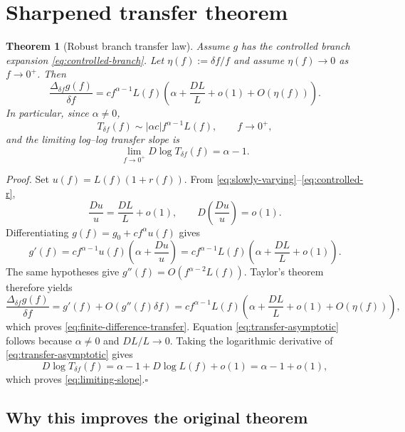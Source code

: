 \documentclass[11pt,a4paper]{article}
\newtheorem{theorem}{Theorem}
\begin{document}
\section{Sharpened transfer theorem}

\begin{theorem}[Robust branch transfer law]\label{thm:robust-transfer}
Assume $g$ has the controlled branch expansion \eqref{eq:controlled-branch}. Let $\eta(f):=\delta f/f$ and assume $\eta(f)\to0$ as $f\to0^+$. Then
\begin{equation}\label{eq:finite-difference-transfer}
    \frac{\Delta_{\delta f}g(f)}{\delta f}
    =c f^{\alpha-1}L(f)\left(\alpha+\frac{DL}{L}+o(1)+O(\eta(f))\right).
\end{equation}
In particular, since $\alpha\ne0$,
\begin{equation}\label{eq:transfer-asymptotic}
    T_{\delta f}(f)
    \sim |\alpha c| f^{\alpha-1}L(f),
    \qquad f\to0^+,
\end{equation}
and the limiting log--log transfer slope is
\begin{equation}\label{eq:limiting-slope}
    \lim_{f\to0^+}D\log T_{\delta f}(f)=\alpha-1.
\end{equation}
\end{theorem}

\noindent\emph{Proof.}
Set $u(f)=L(f)(1+r(f))$. From \eqref{eq:slowly-varying}--\eqref{eq:controlled-r},
\[
    \frac{Du}{u}=\frac{DL}{L}+o(1),
    \qquad
    D\!\left(\frac{Du}{u}\right)=o(1).
\]
Differentiating $g(f)=g_0+c f^{\alpha}u(f)$ gives
\[
    g'(f)=c f^{\alpha-1}u(f)\left(\alpha+\frac{Du}{u}\right)
    =c f^{\alpha-1}L(f)\left(\alpha+\frac{DL}{L}+o(1)\right).
\]
The same hypotheses give $g''(f)=O(f^{\alpha-2}L(f))$. Taylor's theorem therefore yields
\[
    \frac{\Delta_{\delta f}g(f)}{\delta f}
    =g'(f)+O\left(g''(f)\delta f\right)
    =c f^{\alpha-1}L(f)\left(\alpha+\frac{DL}{L}+o(1)+O(\eta(f))\right),
\]
which proves \eqref{eq:finite-difference-transfer}. Equation \eqref{eq:transfer-asymptotic} follows because $\alpha\ne0$ and $DL/L\to0$. Taking the logarithmic derivative of \eqref{eq:transfer-asymptotic} gives
\[
    D\log T_{\delta f}(f)
    =\alpha-1+D\log L(f)+o(1)
    =\alpha-1+o(1),
\]
which proves \eqref{eq:limiting-slope}.\hfill$\square$

\subsection*{Why this improves the original theorem}
\end{document}

